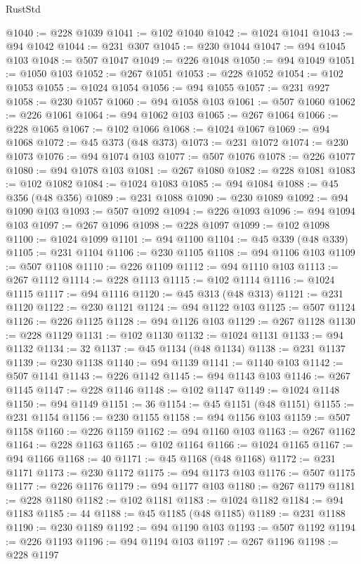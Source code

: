 \begin{lexlean}{RustStd}
\begin{coremodule}
{\begin{coremodule}
{{{{{{{{{{{{{{{{{{{{{{{{{{{{{{{{{{{{{@1040 := @228 @1039
@1041 := @102 @1040
@1042 := @1024 @1041
@1043 := @94 @1042
@1044 := @231 @307
@1045 := @230 @1044
@1047 := @94 @1045 @103
@1048 := @507 @1047
@1049 := @226 @1048
@1050 := @94 @1049
@1051 := @1050 @103
@1052 := @267 @1051
@1053 := @228 @1052
@1054 := @102 @1053
@1055 := @1024 @1054
@1056 := @94 @1055
@1057 := @231 @927
@1058 := @230 @1057
@1060 := @94 @1058 @103
@1061 := @507 @1060
@1062 := @226 @1061
@1064 := @94 @1062 @103
@1065 := @267 @1064
@1066 := @228 @1065
@1067 := @102 @1066
@1068 := @1024 @1067
@1069 := @94 @1068
@1072 := @45 @373 (@48 @373)
@1073 := @231 @1072
@1074 := @230 @1073
@1076 := @94 @1074 @103
@1077 := @507 @1076
@1078 := @226 @1077
@1080 := @94 @1078 @103
@1081 := @267 @1080
@1082 := @228 @1081
@1083 := @102 @1082
@1084 := @1024 @1083
@1085 := @94 @1084
@1088 := @45 @356 (@48 @356)
@1089 := @231 @1088
@1090 := @230 @1089
@1092 := @94 @1090 @103
@1093 := @507 @1092
@1094 := @226 @1093
@1096 := @94 @1094 @103
@1097 := @267 @1096
@1098 := @228 @1097
@1099 := @102 @1098
@1100 := @1024 @1099
@1101 := @94 @1100
@1104 := @45 @339 (@48 @339)
@1105 := @231 @1104
@1106 := @230 @1105
@1108 := @94 @1106 @103
@1109 := @507 @1108
@1110 := @226 @1109
@1112 := @94 @1110 @103
@1113 := @267 @1112
@1114 := @228 @1113
@1115 := @102 @1114
@1116 := @1024 @1115
@1117 := @94 @1116
@1120 := @45 @313 (@48 @313)
@1121 := @231 @1120
@1122 := @230 @1121
@1124 := @94 @1122 @103
@1125 := @507 @1124
@1126 := @226 @1125
@1128 := @94 @1126 @103
@1129 := @267 @1128
@1130 := @228 @1129
@1131 := @102 @1130
@1132 := @1024 @1131
@1133 := @94 @1132
@1134 := 32
@1137 := @45 @1134 (@48 @1134)
@1138 := @231 @1137
@1139 := @230 @1138
@1140 := @94 @1139
@1141 := @1140 @103
@1142 := @507 @1141
@1143 := @226 @1142
@1145 := @94 @1143 @103
@1146 := @267 @1145
@1147 := @228 @1146
@1148 := @102 @1147
@1149 := @1024 @1148
@1150 := @94 @1149
@1151 := 36
@1154 := @45 @1151 (@48 @1151)
@1155 := @231 @1154
@1156 := @230 @1155
@1158 := @94 @1156 @103
@1159 := @507 @1158
@1160 := @226 @1159
@1162 := @94 @1160 @103
@1163 := @267 @1162
@1164 := @228 @1163
@1165 := @102 @1164
@1166 := @1024 @1165
@1167 := @94 @1166
@1168 := 40
@1171 := @45 @1168 (@48 @1168)
@1172 := @231 @1171
@1173 := @230 @1172
@1175 := @94 @1173 @103
@1176 := @507 @1175
@1177 := @226 @1176
@1179 := @94 @1177 @103
@1180 := @267 @1179
@1181 := @228 @1180
@1182 := @102 @1181
@1183 := @1024 @1182
@1184 := @94 @1183
@1185 := 44
@1188 := @45 @1185 (@48 @1185)
@1189 := @231 @1188
@1190 := @230 @1189
@1192 := @94 @1190 @103
@1193 := @507 @1192
@1194 := @226 @1193
@1196 := @94 @1194 @103
@1197 := @267 @1196
@1198 := @228 @1197
}}}}}}}}}}}}}}}}}}}}}}}}}}}}}}}}}}}}}
\end{coremodule}}
\end{coremodule}
\end{lexlean}
